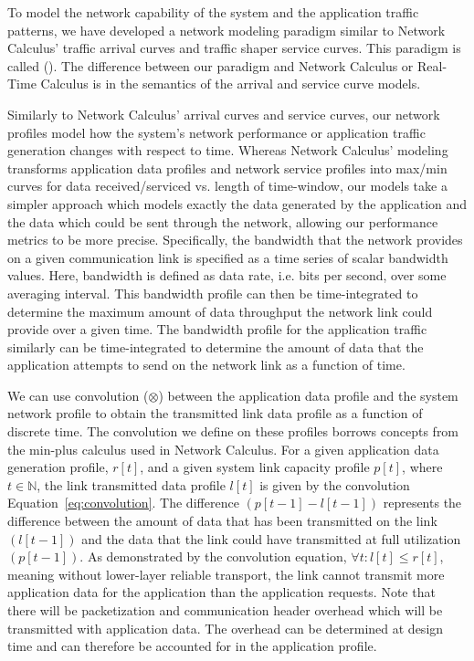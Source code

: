 To model the network capability of the system and the application traffic patterns, we have developed a network modeling paradigm similar to Network Calculus' traffic arrival curves and traffic shaper service curves.  This paradigm is called \fulltool (\shorttool).  The difference between our paradigm and Network Calculus or Real-Time Calculus is in the semantics of the arrival and service curve models.  

Similarly to Network Calculus' arrival curves and service curves, our network profiles model how the system's network performance or application traffic generation changes with respect to time.  Whereas Network Calculus' modeling transforms application data profiles and network service profiles into max/min curves for data received/serviced vs. length of time-window, our models take a simpler approach which models exactly the data generated by the application and the data which could be sent through the network, allowing our performance metrics to be more precise.  Specifically, the bandwidth that the network provides on a given communication link is specified as a time series of scalar bandwidth values. Here, bandwidth is defined as data rate, i.e. bits per second, over some averaging interval.  This bandwidth profile can then be time-integrated to determine the maximum amount of data throughput the network link could provide over a given time.  The bandwidth profile for the application traffic similarly can be time-integrated to determine the amount of data that the application attempts to send on the network link as a function of time.

We can use convolution ($\otimes$) between the application data profile and the system network profile to obtain the transmitted link data profile as a function of discrete time. The convolution we define on these profiles borrows concepts from the min-plus calculus used in Network Calculus. For a given application data generation profile, $r[t]$, and a given system link capacity profile $p[t]$, where $t\in\mathbb{N}$, the link transmitted data profile $l[t]$ is given by the convolution Equation~\ref{eq:convolution}. The difference $(p[t-1] - l[t-1])$ represents the difference between the amount of data that has been transmitted on the link $(l[t-1])$ and the data that the link could have transmitted at full utilization $(p[t-1])$. As demonstrated by the convolution equation, $\forall t : l[t] \le r[t]$, meaning without lower-layer reliable transport, the link cannot transmit more application data for the application than the application requests.  Note that there will be packetization and communication header overhead which will be transmitted with application data.  The overhead can be determined at design time and can therefore be accounted for in the application profile.  

